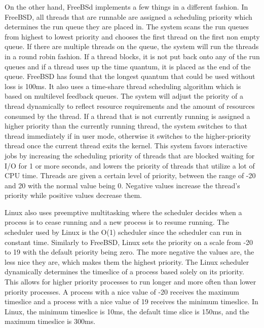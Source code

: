 \documentclass[letterpaper,10pt,draftclsnofoot,onecolumn,titlepage]{IEEEtran}
\begin{document}
	On the other hand, FreeBSd implements a few things in a different fashion. In FreeBSD, all threads that are runnable are assigned a scheduling priority which determines the run queue they are placed in.
	The system scans the run queues from highest to lowest priority and chooses the first thread on the first non empty queue.
	If there are multiple threads on the queue, the system will run the threads in a round robin fashion.
	If a thread blocks, it is not put back onto any of the run queues and if a thread uses up the time quantum, it is placed as the end of the queue.
	FreeBSD has found that the longest quantum that could be used without loss is 100ms.
	It also uses a time-share thread scheduling algorithm which is based on multilevel feedback queues.
	The system will adjust the priority of a thread dynamically to reflect resource requirements and the amount of resources consumed by the thread.
	If a thread that is not currently running is assigned a higher priority than the currently running thread, the system switches to that thread immediately if in user mode, otherwise it switches to the higher-priority thread once the current thread exits the kernel.
	This system favors interactive jobs by increasing the scheduling priority of threads that are blocked waiting for I/O for 1 or more seconds, and lowers the priority of threads that utilize a lot of CPU time.
	Threads are given a certain level of priority, between the range of -20 and 20 with the normal value being 0.
	Negative values increase the thread’s priority while positive values decrease them.

	Linux also uses preemptive multitasking where the scheduler decides when a process is to cease running and a new process is to resume running.
	The scheduler used by Linux is the O(1) scheduler since the scheduler can run in constant time. Similarly to FreeBSD, Linux sets the priority on a scale from -20 to 19 with the default priority being zero.
	The more negative the values are, the less nice they are, which makes them the highest priority. The Linux scheduler dynamically determines the timeslice of a process based solely on its priority.
	This allows for higher priority processes to run longer and more often than lower priority processes.
	A process with a nice value of -20 receives the maximum timeslice and a process with a nice value of 19 receives the minimum timeslice.
	In Linux, the minimum timeslice is 10ms, the default time slice is 150ms, and the maximum timeslice is 300ms.
\end{document}
